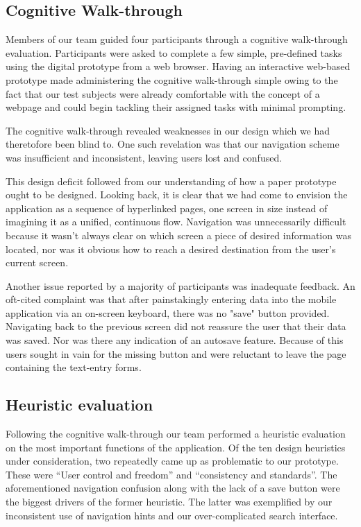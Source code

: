 \documentclass{sigchi-ext}
\begin{document}
\subsection{Cognitive Walk-through}

Members of our team guided four participants through a cognitive walk-through
evaluation. Participants were asked to complete a few simple, pre-defined tasks
using the digital prototype from a web browser. Having an interactive
web-based prototype made administering the cognitive walk-through simple owing
to the fact that our test subjects were already comfortable with the concept of
a webpage and could begin tackling their assigned tasks with minimal prompting.

The cognitive walk-through revealed weaknesses in our design which we had theretofore been blind to.
One such revelation was that our navigation scheme was insufficient and inconsistent, leaving users
lost and confused.

This design deficit followed from our understanding of how a paper prototype
ought to be designed. Looking back, it is clear that we had come to envision
the application as a sequence of hyperlinked pages, one screen in size instead
of imagining it as a unified, continuous flow.  Navigation was unnecessarily
difficult because it wasn't always clear on which screen a piece of desired
information was located, nor was it obvious how to reach a desired destination
from the user's current screen.

Another issue reported by a majority of participants was inadequate feedback.
An oft-cited complaint was that after painstakingly entering data into the
mobile application via an on-screen keyboard, there was no "save" button
provided. Navigating back to the previous screen did not reassure the user that
their data was saved. Nor was there any indication of an autosave feature.
Because of this users sought in vain for the missing button and were reluctant
to leave the page containing the text-entry forms.



\subsection{Heuristic evaluation}

Following the cognitive walk-through our team performed a heuristic evaluation on the most important
functions of the application. Of the ten design heuristics under consideration, two repeatedly came
up as problematic to our prototype. These were ``User control and freedom'' and ``consistency and
standards''. The aforementioned navigation confusion along with the lack of a save button were the
biggest drivers of the former heuristic. The latter was exemplified by our inconsistent use of
navigation hints and our over-complicated search interface.
\end{document}
